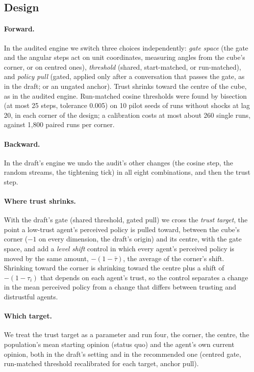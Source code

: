 \documentclass[11pt]{article}
\begin{document}
\subsection{Design}
\paragraph{Forward.} In the audited engine we switch three choices independently: \emph{gate space} (the gate and the angular steps act on unit coordinates, measuring angles from the cube's corner, or on centred ones), \emph{threshold} (shared, start-matched, or run-matched), and \emph{policy pull} (gated, applied only after a conversation that passes the gate, as in the draft; or an ungated anchor). Trust shrinks toward the centre of the cube, as in the audited engine. Run-matched cosine thresholds were found by bisection (at most 25 steps, tolerance 0.005) on 10 pilot seeds of runs without shocks at lag 20, in each corner of the design; a calibration costs at most about 260 single runs, against 1{,}800 paired runs per corner.
\paragraph{Backward.} In the draft's engine we undo the audit's other changes (the cosine step, the random streams, the tightening tick) in all eight combinations, and then the trust step.
\paragraph{Where trust shrinks.} With the draft's gate (shared threshold, gated pull) we cross the \emph{trust target}, the point a low-trust agent's perceived policy is pulled toward, between the cube's corner ($-1$ on every dimension, the draft's origin) and its centre, with the gate space, and add a \emph{level shift} control in which every agent's perceived policy is moved by the same amount, $-(1-\bar\tau)$, the average of the corner's shift.
Shrinking toward the corner is shrinking toward the centre plus a shift of $-(1-\tau_i)$ that depends on each agent's trust, so the control separates a change in the mean perceived policy from a change that differs between trusting and distrustful agents.
\paragraph{Which target.} We treat the trust target as a parameter and run four, the corner, the centre, the population's mean starting opinion (status quo) and the agent's own current opinion, both in the draft's setting and in the recommended one (centred gate, run-matched threshold recalibrated for each target, anchor pull).
\end{document}
